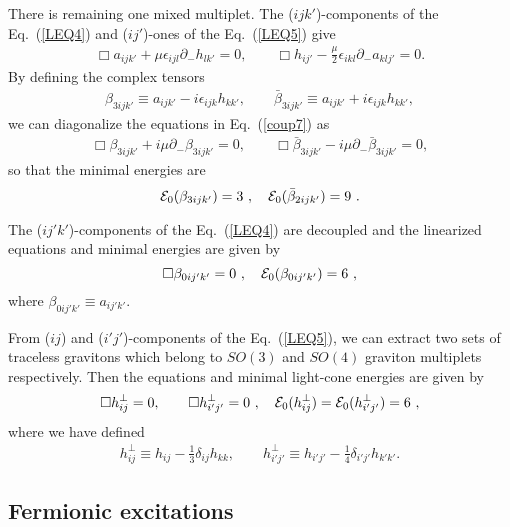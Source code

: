 \documentclass[a4paper,12pt]{article}
\numberwithin{equation}{section}
\begin{document}
There is remaining one mixed multiplet. The ($ijk'$)-components of the
Eq.~(\ref{LEQ4}) and ($ij'$)-ones of the Eq.~(\ref{LEQ5}) give
\begin{eqnarray}
 \Box a_{ijk'} + \mu \epsilon_{ijl}
                  \partial_- h_{lk'} = 0,
\qquad
 \Box h_{ij'} - \frac{\mu}2 \epsilon_{ikl}
\partial_- a_{klj'} = 0.
\label{coup7}
\end{eqnarray}
By defining the complex tensors
\begin{eqnarray}
\beta_{3ijk'} \equiv a_{ijk'} - i \epsilon_{ijk} h_{kk'}, \qquad
\bar\beta_{3ijk'} \equiv a_{ijk'} + i \epsilon_{ijk} h_{kk'}, \label{mod7}
\end{eqnarray}
we can diagonalize the equations in Eq.~(\ref{coup7}) as
\begin{eqnarray}
\Box \beta_{3ijk'} + i\mu\partial_- \beta_{3ijk'} = 0, \qquad \Box
\bar\beta_{3ijk'} - i\mu\partial_- \bar\beta_{3ijk'} = 0, \label{dia7}
\end{eqnarray}
so that the minimal energies are
\begin{equation}\label{eng7}
{\cal E}_0(\beta_{3ijk'}) = 3 ~,~~~
{\cal E}_0(\bar\beta_{2ijk'}) = 9 ~.
\end{equation}

The ($ij'k'$)-components of the Eq.~(\ref{LEQ4}) are decoupled and
the linearized equations and minimal energies are given by
\begin{equation}\label{decoup2}
\Box \beta_{0ij'k'} = 0 ~,~~~
{\cal E}_0 (\beta_{0ij'k'}) = 6 ~,
\end{equation}
where $\beta_{0ij'k'} \equiv a_{ij'k'}$.

From ($ij$) and ($i'j'$)-components of the Eq.~(\ref{LEQ5}),
we can extract two sets of traceless gravitons which belong to
$SO(3)$ and $SO(4)$ graviton multiplets respectively. Then the
equations and minimal light-cone energies are given by
\begin{equation}\label{decoup3}
\Box h^{\perp}_{ij} = 0, \qquad \Box h^{\perp}_{i'j'} =0 ~,~~~
{\cal E}_0 (h^{\perp}_{ij})
          = {\cal E}_0(h^{\perp}_{i'j'}) = 6 ~,
\end{equation}
where we have defined
\begin{eqnarray}
h^{\perp}_{ij} \equiv h_{ij} - \frac13 \delta_{ij} h_{kk}, \qquad
h^{\perp}_{i'j'} \equiv h_{i'j'} - \frac14 \delta_{i'j'}h_{k'k'}.
\nonumber
\end{eqnarray}




\subsection{Fermionic excitations}
\label{f-sugra}
\end{document}
